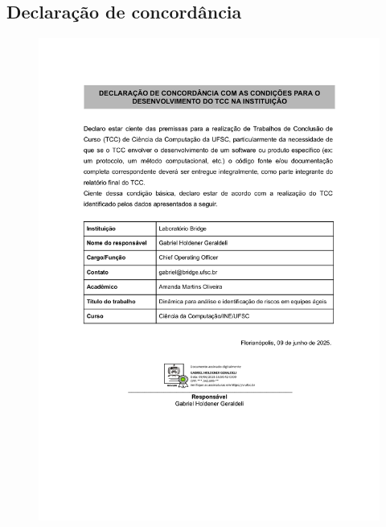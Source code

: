 \documentclass[
	12pt,
	openright,
	twoside,
	a4paper,
	english,
	brazil
	]{abntex2}
\begin{document}
\begin{anexos}

\chapter{Declaração de concordância}
\label{anexo:declaracao-concordancia}

\begin{figure}[H]
  \centering
  \includegraphics[width=1\textwidth]{print_assinatura}
\end{figure}

%

\end{anexos}





\printindex

\end{document}

